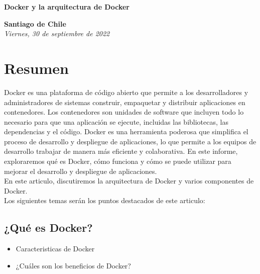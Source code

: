 \documentclass[12pt]{article}
\begin{document}
\onehalfspacing %

\begin{center}
    \vspace*{8cm}
    {\Huge \textbf{\sffamily Docker y la arquitectura de Docker}}\\[0.5em]
\end{center}

\begin{center}
    \vspace{9cm}
    \textcolor{secondary}{\textbf{Santiago de Chile}}\\
    \textit{Viernes, 30 de septiembre de 2022}
    \vspace{1cm}
\end{center}

\newpage

\tableofcontents
\newpage

\section{Resumen}

Docker es una plataforma de código abierto que permite a los desarrolladores y administradores de sistemas construir, empaquetar y distribuir aplicaciones en contenedores. Los contenedores son unidades de software que incluyen todo lo necesario para que una aplicación se ejecute, incluidas las bibliotecas, las dependencias y el código. Docker es una herramienta poderosa que simplifica el proceso de desarrollo y despliegue de aplicaciones, lo que permite a los equipos de desarrollo trabajar de manera más eficiente y colaborativa. En este informe, exploraremos qué es Docker, cómo funciona y cómo se puede utilizar para mejorar el desarrollo y despliegue de aplicaciones.\\

En este articulo, discutiremos la arquitectura de Docker y varios componentes de Docker.\\

Los siguientes temas serán los puntos destacados de este articulo:

\subsection{¿Qué es Docker?}
\begin{itemize}
    \item Caracteristicas de Docker
    \item ¿Cuáles son los beneficios de Docker?
\end{itemize}
\end{document}
